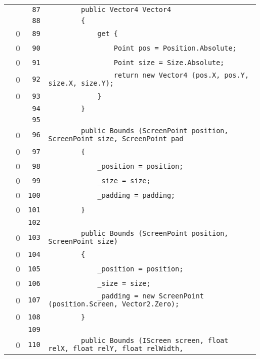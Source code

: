 \documentclass[a4paper,10pt]{article}
\begin{document}
\begin{longtable}[l]{lrrl}
\cellcolor{gray} &  & \verb~87~ & \verb~        public Vector4 Vector4~\\
\cellcolor{gray} &  & \verb~88~ & \verb~        {~\\
\cellcolor{red} & 0 & \verb~89~ & \verb~            get {~\\
\cellcolor{red} & 0 & \verb~90~ & \verb~                Point pos = Position.Absolute;~\\
\cellcolor{red} & 0 & \verb~91~ & \verb~                Point size = Size.Absolute;~\\
\cellcolor{red} & 0 & \verb~92~ & \verb~                return new Vector4 (pos.X, pos.Y, size.X, size.Y);~\\
\cellcolor{red} & 0 & \verb~93~ & \verb~            }~\\
\cellcolor{gray} &  & \verb~94~ & \verb~        }~\\
\cellcolor{gray} &  & \verb~95~ & \verb~~\\
\cellcolor{red} & 0 & \verb~96~ & \verb~        public Bounds (ScreenPoint position, ScreenPoint size, ScreenPoint pad~\\
\cellcolor{red} & 0 & \verb~97~ & \verb~        {~\\
\cellcolor{red} & 0 & \verb~98~ & \verb~            _position = position;~\\
\cellcolor{red} & 0 & \verb~99~ & \verb~            _size = size;~\\
\cellcolor{red} & 0 & \verb~100~ & \verb~            _padding = padding;~\\
\cellcolor{red} & 0 & \verb~101~ & \verb~        }~\\
\cellcolor{gray} &  & \verb~102~ & \verb~~\\
\cellcolor{red} & 0 & \verb~103~ & \verb~        public Bounds (ScreenPoint position, ScreenPoint size)~\\
\cellcolor{red} & 0 & \verb~104~ & \verb~        {~\\
\cellcolor{red} & 0 & \verb~105~ & \verb~            _position = position;~\\
\cellcolor{red} & 0 & \verb~106~ & \verb~            _size = size;~\\
\cellcolor{red} & 0 & \verb~107~ & \verb~            _padding = new ScreenPoint (position.Screen, Vector2.Zero);~\\
\cellcolor{red} & 0 & \verb~108~ & \verb~        }~\\
\cellcolor{gray} &  & \verb~109~ & \verb~~\\
\cellcolor{red} & 0 & \verb~110~ & \verb~        public Bounds (IScreen screen, float relX, float relY, float relWidth,~\\

\end{longtable}
\end{document}
